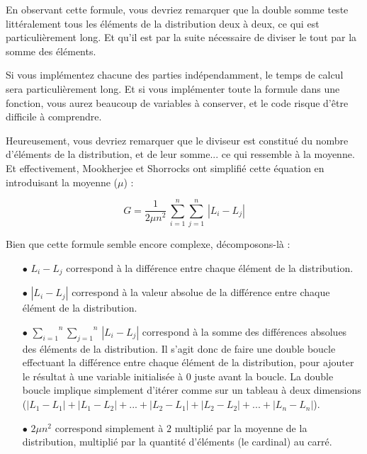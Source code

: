\noindent En observant cette formule, vous devriez remarquer que la double somme teste littéralement tous les éléments de la distribution deux à deux, ce qui est particulièrement long.
Et qu'il est par la suite nécessaire de diviser le tout par la somme des éléments.

\bigskip

\noindent Si vous implémentez chacune des parties indépendamment, le temps de calcul sera particulièrement long.
Et si vous implémenter toute la formule dans une fonction, vous aurez beaucoup de variables à conserver, et le code risque d'être difficile à comprendre.

\bigskip

\noindent Heureusement, vous devriez remarquer que le diviseur est constitué du nombre d'éléments de la distribution, et de leur somme... ce qui ressemble à la moyenne.
Et effectivement, Mookherjee et Shorrocks ont simplifié cette équation en introduisant la moyenne ($ \mu $) :

\begin{center}
\begin{equation*}
G = \frac{1}{2 \mu n^{2}} \, \overset{n}{\underset{i = 1}{\sum}} \overset{n}{\underset{j = 1}{\sum}} \, | L_{i} - L_{j} |
\end{equation*}
\end{center}

\noindent Bien que cette formule semble encore complexe, décomposons-là :

\begin{itemize}
\item[$\bullet$] $ L_{i} - L_{j} $ correspond à la différence entre chaque élément de la distribution.

\item[$\bullet$] $ | L_{i} - L_{j} | $ correspond à la valeur absolue de la différence entre chaque élément de la distribution.

\item[$\bullet$] $ \overset{n}{\underset{i = 1}{\sum}} \overset{n}{\underset{j = 1}{\sum}} \, | L_{i} - L_{j} | $ correspond à la somme des différences absolues des éléments de la distribution. Il s'agit donc de faire une double boucle effectuant la différence entre chaque élément de la distribution, pour ajouter le résultat à une variable initialisée à $ 0 $ juste avant la boucle. La double boucle implique simplement d'itérer comme sur un tableau à deux dimensions ($ | L_{1} - L_{1} | + | L_{1} - L_{2} | + ... + | L_{2} - L_{1} | + | L_{2} - L_{2} | + ... + | L_{n} - L_{n} | $).

\item[$\bullet$] $  2 \mu n^{2} $ correspond simplement à $ 2 $ multiplié par la moyenne de la distribution, multiplié par la quantité d'éléments (le cardinal) au carré.
\end{itemize}



